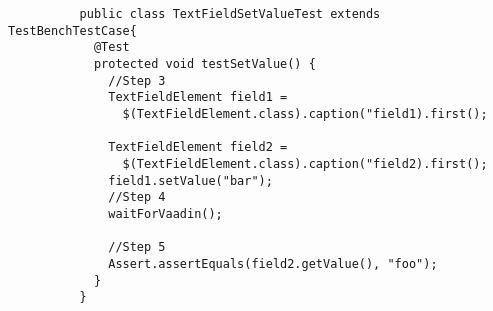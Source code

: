 	    \lstset{language=Java}
	    \begin{lstlisting}
	      public class TextFieldSetValueTest extends TestBenchTestCase{
	        @Test
	        protected void testSetValue() {
	          //Step 3
	          TextFieldElement field1 =
	            $(TextFieldElement.class).caption("field1).first();
	            
	          TextFieldElement field2 =
	            $(TextFieldElement.class).caption("field2).first();  
	          field1.setValue("bar");
	          //Step 4
	          waitForVaadin();
	          
	          //Step 5
	          Assert.assertEquals(field2.getValue(), "foo");           
	        }
	      }
	    \end{lstlisting}  

\fi